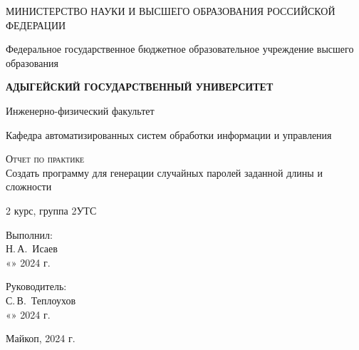 \documentclass[12pt,a4paper]{scrartcl}
\begin{document}
    \begin{titlepage}
        \begin{center}
            \large
            МИНИСТЕРСТВО НАУКИ И ВЫСШЕГО ОБРАЗОВАНИЯ РОССИЙСКОЙ ФЕДЕРАЦИИ
			
			Федеральное государственное бюджетное образовательное учреждение высшего образования
			
			\textbf{АДЫГЕЙСКИЙ ГОСУДАРСТВЕННЫЙ УНИВЕРСИТЕТ}
			\vspace{0.25cm}
			
			Инженерно-физический факультет
			
			Кафедра автоматизированных систем обработки информации и управления
			\vfill

			\vfill
			
			\textsc{Отчет по практике}\\[5mm]
			
			{\LARGE Создать программу для генерации случайных паролей заданной длины и сложности  \textit{}}
			\bigskip
			
			2 курс, группа 2УТС
        \end{center}
        \vfill
        \newlength{\ML}
		\hfill\begin{minipage}{0.5\textwidth}
			Выполнил:\\
			\underline{\hspace{\ML}} Н.\,А.~Исаев\\
			«\underline{\hspace{0.7cm}}» \underline{\hspace{2cm}} 2024 г.
		\end{minipage}%
		\bigskip
		
		\hfill\begin{minipage}{0.5\textwidth}
			Руководитель:\\
			\underline{\hspace{\ML}} С.\,В.~Теплоухов\\
			«\underline{\hspace{0.7cm}}» \underline{\hspace{2cm}} 2024 г.
		\end{minipage}%
		\vfill
        \begin{center}
			Майкоп, 2024 г.
		\end{center}

    \end{titlepage}
\end{document}
